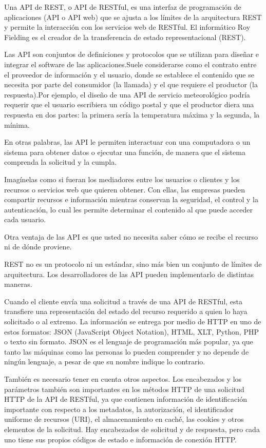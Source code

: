 Una API de REST, o API de RESTful, es una interfaz de programación de aplicaciones (API o API web) que se ajusta a los límites de la arquitectura REST y permite la interacción con los servicios web de RESTful. El informático Roy Fielding es el creador de la transferencia de estado representacional (REST).

Las API son conjuntos de definiciones y protocolos que se utilizan para diseñar e integrar el software de las aplicaciones.Suele considerarse como el contrato entre el proveedor de información y el usuario, donde se establece el contenido que se necesita por parte del consumidor (la llamada) y el que requiere el productor (la respuesta).Por ejemplo, el diseño de una API de servicio meteorológico podría requerir que el usuario escribiera un código postal y que el productor diera una respuesta en dos partes: la primera sería la temperatura máxima y la segunda, la mínima.

En otras palabras, las API le permiten interactuar con una computadora o un sistema para obtener datos o ejecutar una función, de manera que el sistema comprenda la solicitud y la cumpla. 

Imagínelas como si fueran los mediadores entre los usuarios o clientes y los recursos o servicios web que quieren obtener. Con ellas, las empresas pueden compartir recursos e información mientras conservan la seguridad, el control y la autenticación, lo cual les permite determinar el contenido al que puede acceder cada usuario. 

Otra ventaja de las API es que usted no necesita saber cómo se recibe el recurso ni de dónde proviene.

REST no es un protocolo ni un estándar, sino más bien un conjunto de límites de arquitectura. Los desarrolladores de las API pueden implementarlo de distintas maneras.

Cuando el cliente envía una solicitud a través de una API de RESTful, esta transfiere una representación del estado del recurso requerido a quien lo haya solicitado o al extremo. La información se entrega por medio de HTTP en uno de estos formatos: JSON (JavaScript Object Notation), HTML, XLT, Python, PHP o texto sin formato. JSON es el lenguaje de programación más popular, ya que tanto las máquinas como las personas lo pueden comprender y no depende de ningún lenguaje, a pesar de que su nombre indique lo contrario. 

También es necesario tener en cuenta otros aspectos. Los encabezados y los parámetros también son importantes en los métodos HTTP de una solicitud HTTP de la API de RESTful, ya que contienen información de identificación importante con respecto a los metadatos, la autorización, el identificador uniforme de recursos (URI), el almacenamiento en caché, las cookies y otros elementos de la solicitud. Hay encabezados de solicitud y de respuesta, pero cada uno tiene sus propios códigos de estado e información de conexión HTTP.

